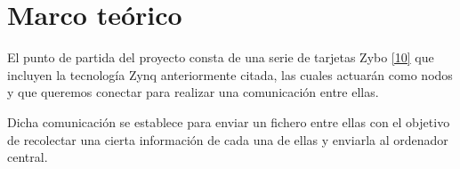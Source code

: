 \section{Marco teórico}
El punto de partida del proyecto consta de una serie de tarjetas Zybo \hyperlink{10}{[10]} que incluyen la tecnología Zynq anteriormente citada, las cuales actuarán como nodos y que queremos conectar para realizar una comunicación entre ellas.

Dicha comunicación se establece para enviar un fichero entre ellas con el objetivo de recolectar una cierta información de cada una de ellas y enviarla al ordenador central.

